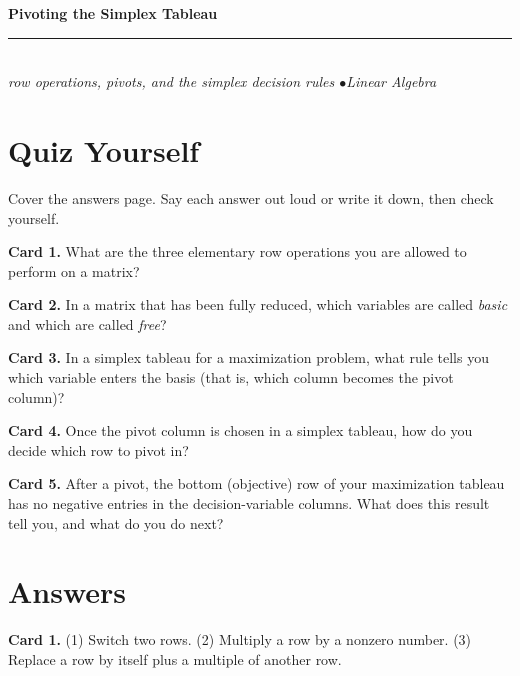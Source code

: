 \documentclass[11pt]{article}
\begin{document}
\begin{center}
{\LARGE\bfseries Pivoting the Simplex Tableau}\\[3pt]
\rule{2.2in}{0.8pt}\\[5pt]
{\itshape row operations, pivots, and the simplex decision rules \quad$\bullet$\quad Linear Algebra}
\end{center}

\section*{Quiz Yourself}

Cover the answers page. Say each answer out loud or write it down, then check yourself.

\begin{cardbox}
\textbf{Card 1.} What are the three elementary row operations you are allowed to perform on a matrix?
\end{cardbox}

\begin{cardbox}
\textbf{Card 2.} In a matrix that has been fully reduced, which variables are called \emph{basic} and which are called \emph{free}?
\end{cardbox}

\begin{cardbox}
\textbf{Card 3.} In a simplex tableau for a maximization problem, what rule tells you which variable enters the basis (that is, which column becomes the pivot column)?
\end{cardbox}

\begin{cardbox}
\textbf{Card 4.} Once the pivot column is chosen in a simplex tableau, how do you decide which row to pivot in?
\end{cardbox}

\begin{cardbox}
\textbf{Card 5.} After a pivot, the bottom (objective) row of your maximization tableau has no negative entries in the decision-variable columns. What does this result tell you, and what do you do next?
\end{cardbox}

\newpage

\section*{Answers}

\begin{cardbox}
\textbf{Card 1.} (1) Switch two rows. (2) Multiply a row by a nonzero number. (3) Replace a row by itself plus a multiple of another row.
\end{cardbox}
\end{document}
